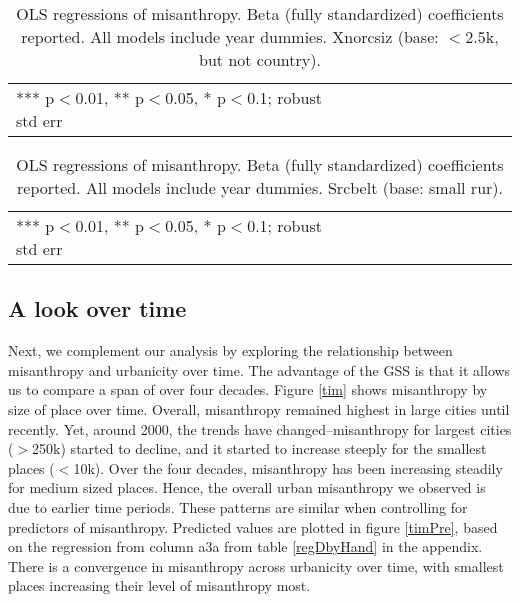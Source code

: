 \documentclass[10pt, letterpaper]{article}
\begin{document}
\begin{spacing}{1.4}
\begin{table}[H]\centering
\caption{OLS regressions  of misanthropy. Beta (fully standardized) coefficients
  reported. All models include year dummies.  Xnorcsiz (base: $<$2.5k, but not country).} \label{regB}
\begin{scriptsize} \begin{tabular}{p{1.8in}p{.45in}p{.45in}p{.45in}p{.45in}p{.45in}p{.45in}p{.45in}p{.45in}p{.45in}p{.45 in}}\hline

\hline  *** p$<$0.01, ** p$<$0.05, * p$<$0.1; robust std err
\end{tabular}\end{scriptsize}\end{table}

\begin{table}[H]\centering
\caption{OLS regressions  of misanthropy. Beta (fully standardized) coefficients
  reported. All models include year dummies. Srcbelt (base: small rur).} \label{regC}
\begin{scriptsize} \begin{tabular}{p{1.8in}p{.45in}p{.45in}p{.45in}p{.45in}p{.45in}p{.45in}p{.45in}p{.45in}p{.45in}p{.45 in}}\hline

\hline  *** p$<$0.01, ** p$<$0.05, * p$<$0.1; robust std err
\end{tabular}\end{scriptsize}\end{table}



\subsection*{A look over time}

Next, we complement our analysis by exploring the relationship between misanthropy and urbanicity over time. The advantage of the GSS is that it allows us to compare a span of over four decades. Figure \ref{tim} shows misanthropy by size of place over time. Overall, misanthropy remained highest in large cities until recently. Yet, around 2000, the trends have changed--misanthropy for largest cities ($>$250k) started to decline, and it started to increase steeply for the smallest places ($<$10k). Over the four decades, misanthropy has been increasing steadily for medium sized places. Hence, the overall urban misanthropy we observed is due to earlier time periods. 
%
These patterns are similar when controlling for predictors of
misanthropy. Predicted values are plotted in figure \ref{timPre}, based on the regression from column a3a from table \ref{regDbyHand} in the appendix. There is a convergence in misanthropy across urbanicity over time, with smallest places increasing their level of misanthropy most.  
 


\end{spacing}
\end{document}

